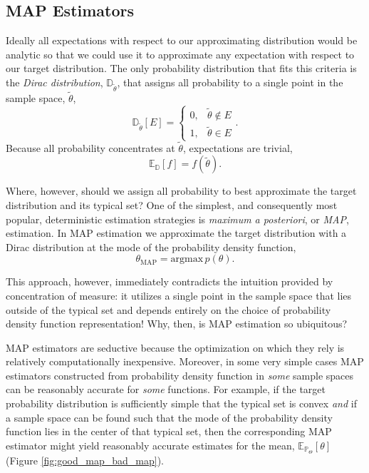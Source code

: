 \documentclass[11pt, oneside]{article}
\newcommand{\PP}{ \mathbb{P} }
\newcommand{\EE}{ \mathbb{E} }
\begin{document}
\subsection{MAP Estimators}

Ideally all expectations with respect to our approximating distribution 
would be analytic so that we could use it to approximate any 
expectation with respect to our target distribution.  The only
probability distribution that fits this criteria is the \emph{Dirac distribution},
$\mathbb{D}_{\tilde{\theta}}$, that assigns all probability to a single point 
in the sample space, $\tilde{\theta}$,
%
\begin{equation*}
\mathbb{D}_{\tilde{\theta}} \! \left[ E \right] = 
\left\{
\begin{array}{rr}
0, & \tilde{\theta} \notin E  \\
1, & \tilde{\theta} \in E
\end{array}
\right. .
\end{equation*}
%
Because all probability concentrates at $\tilde{\theta}$, expectations 
are trivial,
%
\begin{equation*}
\EE_{\mathbb{D}} \! \left[ f \right] 
=
 f \! \left( \tilde{\theta} \right).
\end{equation*} 

Where, however, should we assign all probability to best approximate
the target distribution and its typical set?  One of the simplest, and 
consequently most popular, deterministic estimation strategies is 
\emph{maximum a posteriori}, or \emph{MAP}, estimation.  In MAP
estimation we approximate the target distribution with a Dirac distribution 
at the mode of the probability density function,
%
\begin{equation*}
\theta_{\mathrm{MAP}} = \mathrm{argmax} \, p \! \left( \theta \right).
\end{equation*}


This approach, however, immediately contradicts the intuition provided by 
concentration of measure: it utilizes a single point in the sample space
that lies outside of the typical set and depends entirely on the choice of
probability density function representation!  Why, then, is MAP estimation
so ubiquitous?

MAP estimators are seductive because the optimization on which they
rely is relatively computationally inexpensive.  Moreover, in some very 
simple cases MAP estimators constructed from probability density function
in \emph{some} sample spaces can be reasonably accurate for 
\emph{some} functions.  For example, if the target probability distribution 
is sufficiently simple that the typical set is convex \emph{and} if a 
sample space can be found such that the mode of the probability density 
function lies in the center of that typical set, then the corresponding MAP 
estimator might yield reasonably accurate estimates for the mean, 
$\EE_{\PP_{\Theta}} \! \left[ \theta \right]$ (Figure \ref{fig:good_map_bad_map}).
\end{document}
